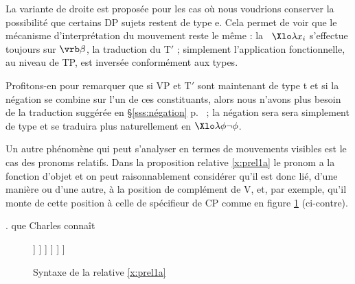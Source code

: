 La variante de droite est proposée pour les cas où nous voudrions conserver la possibilité que certains DP sujets restent de type \typ e.  Cela permet de voir que le mécanisme d'interprétation du mouvement reste le même : la \labstraction\ $\Xlo\lambda x_i$ s'effectue toujours sur $\vrb\beta$, la traduction du T$'$ ; simplement l'application fonctionnelle, au niveau de TP, est inversée conformément aux types.

Profitons-en pour remarquer que si VP et T$'$ sont maintenant de type \typ t et si la négation se combine sur l'un de ces constituants, alors nous n'avons plus besoin de la traduction suggérée en \S\ref{sss:négation} p.~\pageref{sss:négation} ; la négation sera sera simplement de type  et se traduira plus naturellement en $\Xlo\lambda\phi\neg\phi$.

\smallskip

Un autre phénomène qui peut s'analyser en termes de mouvements visibles est le cas des pronoms relatifs.  Dans la proposition relative \ref{x:prel1a} le pronom  a la fonction d'objet et on peut raisonnablement considérer qu'il est donc lié, d'une manière ou d'une autre, à la position de complément de V, et, par exemple, qu'il monte de cette position à celle de spécifieur de CP comme en figure \ref{x:prel1b} (ci-contre).\label{p.montprorel} 

\ex. 
que Charles connaît \label{x:prel1a}


\begin{figure}
\begin{center}
\small 
\Tree
[.CP 
  [.DP$_2$ \rnode{q}{que} ]
  [.C$'$ 
    [.TP 
      [.DP$_1$ \rnode{C}{Charles} ] 
      [.T$'$ T 
	[.VP  [.DP \rnode{t1}{$t_1$} ]
          [.V$'$
            [.V  connaît ] [.DP  \rnode{t2}{$t_2$} ] 
          ]
        ] 
      ]
    ] 
  ] 
]
\normalsize\\
\end{center}
\caption{Syntaxe de la relative \ref{x:prel1a}}\label{x:prel1b}
\end{figure}

